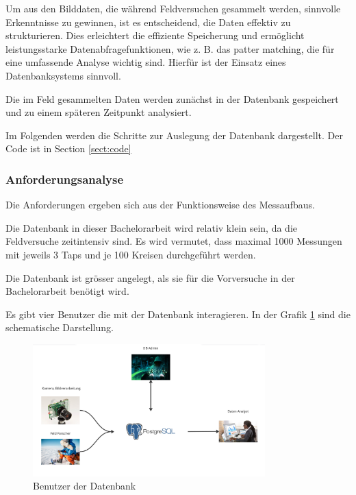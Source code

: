 
Um aus den Bilddaten, die während Feldversuchen gesammelt werden, sinnvolle Erkenntnisse zu gewinnen, ist es entscheidend, die Daten effektiv zu strukturieren. Dies erleichtert die effiziente Speicherung und ermöglicht leistungsstarke Datenabfragefunktionen, wie z. B. das patter matching, die für eine umfassende Analyse wichtig sind. Hierfür ist der Einsatz eines Datenbanksystems sinnvoll.

Die im Feld gesammelten Daten werden zunächst in der Datenbank gespeichert und zu einem späteren Zeitpunkt analysiert.

Im Folgenden werden die Schritte zur Auslegung der Datenbank dargestellt. Der Code ist in Section \ref{sect:code}

\subsubsection{Anforderungsanalyse}

Die Anforderungen ergeben sich aus der Funktionsweise des Messaufbaus.

Die Datenbank in dieser Bachelorarbeit wird relativ klein sein, da die Feldversuche zeitintensiv sind. Es wird vermutet, dass maximal 1000 Messungen mit jeweils 3 Taps und je 100 Kreisen durchgeführt werden.

Die Datenbank ist grösser angelegt, als sie für die Vorversuche in der Bachelorarbeit benötigt wird.

Es gibt vier Benutzer die mit der Datenbank interagieren. In der Grafik \ref{fig:user-db-entwurf} sind die schematische Darstellung.

\begin{figure}
    \centering
    \includegraphics[width=0.8\textwidth]{Bilder/Screenshotfrom2024-04-0115-26-08.png}
    \caption{Benutzer der Datenbank}
    \label{fig:user-db-entwurf}
\end{figure}

